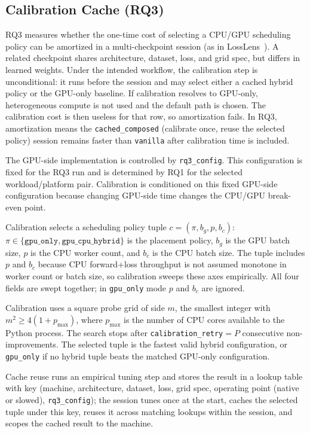 \subsection{Calibration Cache (RQ3)}\label{methods-calibration}

RQ3 measures whether the one-time cost of selecting a CPU/GPU
scheduling policy can be amortized in a multi-checkpoint
session (as in LossLens~\cite{xie2025losslens}). A related checkpoint shares
architecture, dataset, loss, and grid spec, but differs in
learned weights. Under the intended workflow, the calibration
step is unconditional: it runs before the session and may select
either a cached hybrid policy or the GPU-only baseline. If
calibration resolves to GPU-only, heterogeneous compute is not
used and the default path is chosen. The calibration cost is
then useless for that row, so amortization fails. In RQ3,
amortization means the \texttt{cached\_composed} (calibrate
once, reuse the selected policy) session remains faster than
\texttt{vanilla} after calibration time is included.

The GPU-side implementation is controlled by
\texttt{rq3\_config}. This configuration is fixed for
the RQ3 run and is determined by RQ1 for the selected
workload/platform pair. Calibration is conditioned on this
fixed GPU-side configuration because changing GPU-side time changes
the CPU/GPU break-even point.

Calibration selects a scheduling policy tuple
$c=(\pi,b_g,p,b_c)$:
$\pi\in\{\texttt{gpu\_only},\texttt{gpu\_cpu\_hybrid}\}$ is
the placement policy, $b_g$ is the GPU batch size, $p$ is
the CPU worker count, and $b_c$ is the CPU batch size. The
tuple includes $p$ and $b_c$ because CPU forward+loss
throughput is not assumed monotone in worker count or batch
size, so calibration sweeps these axes empirically. All four
fields are swept together; in \texttt{gpu\_only} mode $p$ and
$b_c$ are ignored.

Calibration uses a square probe grid of side $m$, the
smallest integer with $m^2 \ge 4(1+p_{\max})$, where
$p_{\max}$ is the number of CPU cores available to the Python process. The search stops after
\texttt{calibration\_retry}$=P$ consecutive non-improvements.
The selected tuple
is the fastest valid hybrid configuration, or
\texttt{gpu\_only} if no hybrid tuple beats the matched
GPU-only configuration.

Cache reuse runs an empirical tuning step and stores the result in a lookup table with key (machine, architecture, dataset, loss,
grid spec, operating point (native or slowed), \texttt{rq3\_config});
the session tunes once at the start, caches the selected tuple
under this key, reuses it across matching lookups within the
session, and scopes the cached result to the machine.

